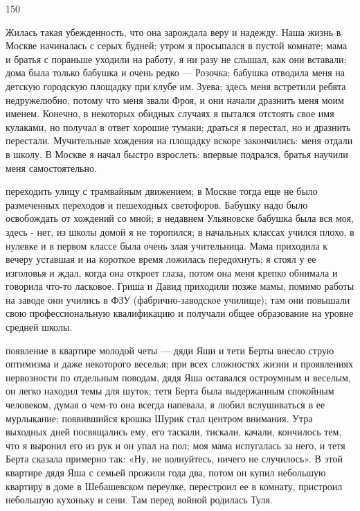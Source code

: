 150

Жилась такая убежденность, что она зарождала веру и надежду. Наша жизнь в Москве начиналась с серых будней; утром я просыпался в пустой комнате; мама и братья с пораньше уходили на работу, я ни разу не слышал, как они вставали; дома была только бабушка и очень редко — Розочка; бабушка отводила меня на детскую городскую площадку при клубе им. Зуева; здесь меня встретили ребята недружелюбно, потому что меня звали Фроя, и они начали дразнить меня моим именем. Конечно, в некоторых обидных случаях я пытался отстоять свое имя кулаками, но получал в ответ хорошие тумаки; драться я перестал, но и дразнить перестали. Мучительные хождения на площадку вскоре закончились: меня отдали в школу. В Москве я начал быстро взрослеть: впервые подрался, братья научили меня самостоятельно.

переходить улицу с трамвайным движением; в Москве тогда еще не было размеченных переходов и пешеходных светофоров. Бабушку надо было освобождать от хождений со мной; в недавнем Ульяновске бабушка была вся моя, здесь - нет, из школы домой я не торопился; в начальных классах учился плохо, в нулевке и в первом классе была очень злая учительница. Мама приходила к вечеру уставшая и на короткое время ложилась передохнуть; я стоял у ее изголовья и ждал, когда она откроет глаза, потом она меня крепко обнимала и говорила что-то ласковое. Гриша и Давид приходили позже мамы, помимо работы на заводе они учились в ФЗУ (фабрично-заводское училище); там они повышали свою профессиональную квалификацию и получали общее образование на уровне средней школы.

появление в квартире молодой четы — дяди Яши и тети Берты внесло струю оптимизма и даже некоторого веселья; при всех сложностях жизни и проявлениях нервозности по отдельным поводам, дядя Яша оставался остроумным и веселым, он легко находил темы для шуток; тетя Берта была выдержанным спокойным человеком, думая о чем-то она всегда напевала, я любил вслушиваться в ее мурлыкание; появившийся крошка Шурик стал центром внимания. Утра выходных дней посвящались ему, его таскали, тискали, качали, кончилось тем, что я выронил его из рук и он упал на пол; моя мама испугалась за него, и тетя Берта сказала примерно так: «Ну, не волнуйтесь, ничего не случилось». В этой квартире дядя Яша с семьей прожили года два, потом он купил небольшую квартиру в доме в Шебашевском переулке, перестроил ее в комнату, пристроил небольшую кухоньку и сени. Там перед войной родилась Туля.

